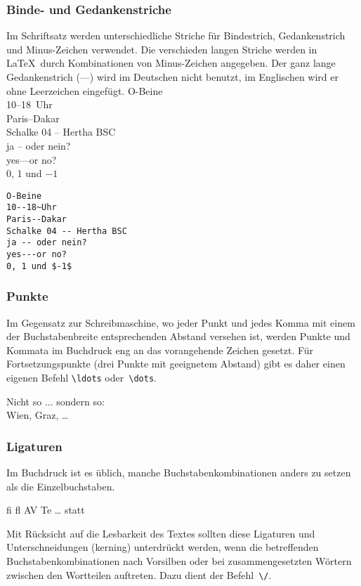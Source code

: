 \subsubsection{Binde- und Gedankenstriche}
 
Im Schriftsatz werden unterschiedliche Striche für Bindestrich,
Gedankenstrich und Minus-Zeichen verwendet.
Die verschieden langen Striche werden in \LaTeX\ durch
Kombinationen von Minus-Zeichen angegeben. Der ganz lange
Gedankenstrich (\mbox{---}) wird im Deutschen nicht benutzt, im
Englischen wird er ohne Leerzeichen eingefügt.
\exa
O-Beine \\
10--18~Uhr \\
Paris--Dakar \\
Schalke 04 -- Hertha BSC \\
ja -- oder nein? \\
yes---or no? \\
0, 1 und $-1$
\exb
\begin{verbatim}
O-Beine
10--18~Uhr
Paris--Dakar
Schalke 04 -- Hertha BSC
ja -- oder nein?
yes---or no?
0, 1 und $-1$
\end{verbatim}
\exc
 
\subsubsection{Punkte}
 
Im Gegensatz zur Schreibmaschine, wo jeder Punkt und jedes Komma
mit einem der Buchstabenbreite entsprechenden Abstand versehen
ist, werden Punkte und Kommata im Buchdruck eng an das
vorangehende Zeichen gesetzt. Für Fortsetzungspunkte (drei
Punkte mit geeignetem Abstand) gibt es daher einen eigenen Befehl
\lstinline|\ldots| oder~\lstinline|\dots|.

\begin{LTXexample}
Nicht so ... sondern so: \\
Wien, Graz, \dots
\end{LTXexample}

 
\subsubsection{Ligaturen}
 
Im Buchdruck ist es üblich, manche Buchstabenkombinationen
anders zu setzen als die Einzelbuchstaben.
\begin{beispiel}
{\large fi fl AV Te \dots}\quad
statt
\end{beispiel}
Mit Rücksicht auf die Lesbarkeit des Textes sollten
diese  Ligaturen und Unterschneidungen (kerning) 
unterdrückt werden, wenn die betreffenden Buchstabenkombinationen 
nach Vorsilben oder bei zusammengesetzten Wörtern zwischen den
Wortteilen auftreten.  Dazu dient der Befehl~\lstinline|\/|.

